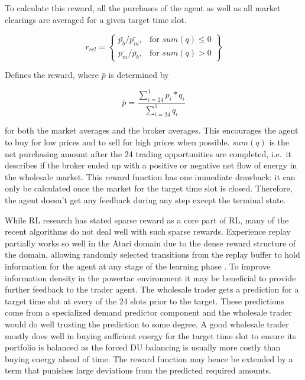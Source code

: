 To calculate this reward, all the purchases of the agent as well as all market clearings are averaged for a given target
time slot.

\begin{equation}
    r_{rel} = \left\{
        \begin{array}{lr}
            \bar{p_b} / \bar{p_m}, & \text{for } sum(q) \leq 0 \\
            \bar{p_m} / \bar{p_b}, & \text{for } sum(q) > 0
    \end{array}\right\}
\end{equation}

Defines the reward, where $\bar{p}$ is determined by

\begin{equation}
    \bar{p} =\frac{\sum ^{1}_{i=24} p_{i} *q_{i}}{\sum ^{1}_{i=24} q_{i}}
\end{equation}

for both the market averages and the broker averages. This encourages the agent to buy for low prices and to sell for high
prices when possible. $sum(q)$ is the net purchasing amount after the 24 trading opportunities are completed, i.e.\ it
describes if
the broker ended up with a positive or negative net flow of energy in the wholesale market. This reward function has one
immediate drawback: it can only be calculated once the market for the target time slot is closed. Therefore, the agent 
doesn't get any feedback during any step except the terminal state.

While \ac{RL} research has stated sparse reward as a core part of \ac{RL}, many of the recent algorithms do
not deal well with such sparse rewards. Experience replay partially works so well in the Atari domain due to the dense
reward structure of the domain, allowing randomly selected transitions from the replay buffer to hold information for
the agent at any stage of the learning phase \citep{schaul2015prioritized}.
To improve information density in the powertac environment it may be beneficial to provide further feedback to the
trader agent. The wholesale trader gets a prediction for a target time slot at every of the 24 slots prior to the
target. These predictions come from a specialized demand predictor component and the wholesale trader would do well 
trusting the prediction to some degree. A good wholesale trader mostly does well in buying sufficient energy for the target
time slot to ensure its portfolio is balanced as the forced \ac{DU} balancing is usually more costly than buying energy
ahead of time. The reward function may hence be extended by a term that punishes large
deviations from the predicted required amounts.


